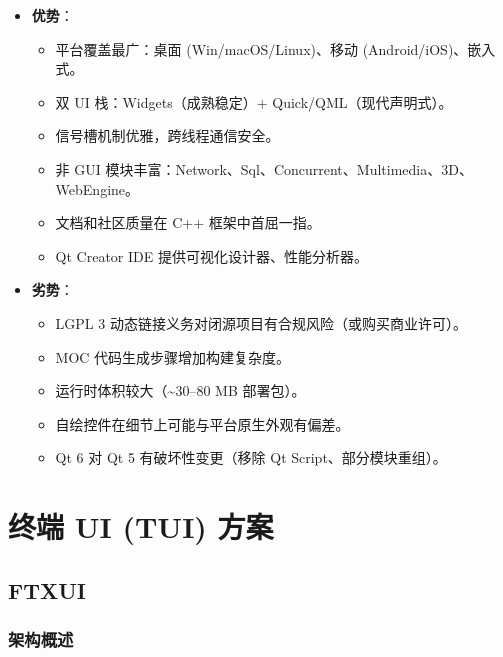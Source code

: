 \documentclass[12pt,a4paper,fontset=fandol]{ctexbook}
\begin{document}
\begin{compare}[title=Qt 优劣分析]
\begin{itemize}
  \item \textbf{优势}：
    \begin{itemize}
      \item 平台覆盖最广：桌面 (Win/macOS/Linux)、移动 (Android/iOS)、嵌入式。
      \item 双 UI 栈：Widgets（成熟稳定）+ Quick/QML（现代声明式）。
      \item 信号槽机制优雅，跨线程通信安全。
      \item 非 GUI 模块丰富：Network、Sql、Concurrent、Multimedia、3D、Web\allowbreak{}Engine。
      \item 文档和社区质量在 C++ 框架中首屈一指。
      \item Qt Creator IDE 提供可视化设计器、性能分析器。
    \end{itemize}
  \item \textbf{劣势}：
    \begin{itemize}
      \item LGPL 3 动态链接义务对闭源项目有合规风险（或购买商业许可）。
      \item MOC 代码生成步骤增加构建复杂度。
      \item 运行时体积较大（\textasciitilde30--80 MB 部署包）。
      \item 自绘控件在细节上可能与平台原生外观有偏差。
      \item Qt 6 对 Qt 5 有破坏性变更（移除 Qt Script、部分模块重组）。
    \end{itemize}
\end{itemize}
\end{compare}

\part{终端 UI (TUI) 方案}

\chapter{FTXUI}

\section{架构概述}
\end{document}
